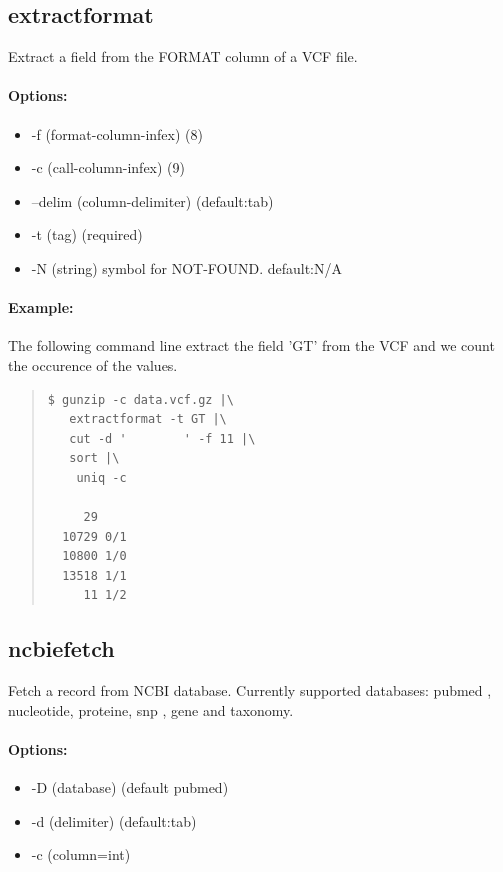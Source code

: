 \documentclass[12pt]{article}
\begin{document}
\subsection{extractformat}
Extract a field from the FORMAT column of a VCF file.
\paragraph{Options:}
\begin{itemize}
\item-f (format-column-infex) (8)
\item-c (call-column-infex) (9)
\item--delim (column-delimiter) (default:tab)
\item-t (tag) (required)
\item-N (string) symbol for NOT-FOUND. default:N/A
\end{itemize}
\paragraph{Example:}
The following command line extract the field 'GT' from the VCF and we count the occurence of the values.

\begin{quote}
\begin{verbatim}
$ gunzip -c data.vcf.gz |\
   extractformat -t GT |\
   cut -d '        ' -f 11 |\
   sort |\
    uniq -c

     29 
  10729 0/1
  10800 1/0
  13518 1/1
     11 1/2
\end{verbatim}
\end{quote}

\subsection{ncbiefetch}
Fetch a record from NCBI database.
Currently supported databases: pubmed , nucleotide, proteine, snp , gene and taxonomy.
\paragraph{Options:}
\begin{itemize}
\item-D (database) (default pubmed)
\item-d (delimiter) (default:tab)
\item-c (column=int) 
\end{itemize}
\end{document}
